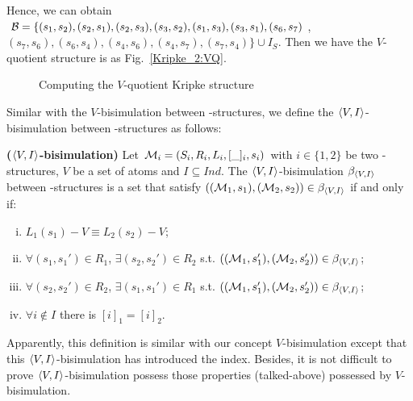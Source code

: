 \documentclass{article}
\begin{document}
\begin{example}
Hence, we can obtain ${\cal B}=\{(s_1,s_2), (s_2,s_1), (s_2,s_3),(s_3,s_2), (s_1,s_3), (s_3, s_1), (s_6, s_7)$, $(s_7,s_6), (s_6,s_4), (s_4,s_6), (s_4, s_7), (s_7, s_4)\} \cup I_S$. Then we have the $V$-quotient structure is as Fig.~\ref{Kripke_2:VQ}.
\begin{figure}
  \centering
        \hspace{1in}
       \caption{Computing the $V$-quotient Kripke structure}
    \label{fig:subfig} %
\end{figure}
\end{example}

Similar with the $V$-bisimulation between \MPK-structures, we define the ${\langle{V,I}\rangle}$-bisimulation between \Ind-structures as follows:
\begin{definition}\label{def:VInd:bisimulation}
\textbf{(${\langle{V,I}\rangle}$-bisimulation)}
Let ${\cal M}_i=(S_i, R_i, L_i, [\_]_i, s_i)$ with $i\in \{1, 2\}$ be two \Ind-structures, $V$ be a set of atoms and $I \subseteq Ind$. The ${\langle{V,I}\rangle}$-bisimulation $\beta_{{\langle{V,I}\rangle}}$ between \Ind-structures is a set that satisfy $(({\cal M}_1, s_1), ({\cal M}_2, s_2)) \in \beta_{{\langle{V,I}\rangle}}$  if and only if:
\begin{enumerate}[(i)]
    \item $L_1(s_1) - V \equiv L_2(s_2) -V$;
    \item $\forall (s_1, s_1')\in R_1$, $\exists (s_2, s_2')\in R_2$ s.t. $(({\cal M}_1, s_1'), ({\cal M}_2, s_2')) \in \beta_{{\langle{V,I}\rangle}}$;
    \item $\forall (s_2, s_2')\in R_2$, $\exists (s_1, s_1')\in R_1$ s.t. $(({\cal M}_1, s_1'), ({\cal M}_2, s_2')) \in \beta_{{\langle{V,I}\rangle}}$;
    \item $\forall i \notin I$ there is $[i]_1 = [i]_2$.
\end{enumerate}
\end{definition}
Apparently, this definition is similar with our concept $V$-bisimulation except that this ${\langle{V,I}\rangle}$-bisimulation has introduced the index.
Besides, it is not difficult to prove ${\langle{V,I}\rangle}$-bisimulation possess those properties (talked-above) possessed by $V$-bisimulation.
\end{document}
